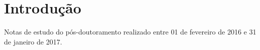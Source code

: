 \chapter*{Introdução}

Notas de estudo do pós-doutoramento realizado entre 01 de fevereiro de 2016 e 31 de janeiro de 2017.
